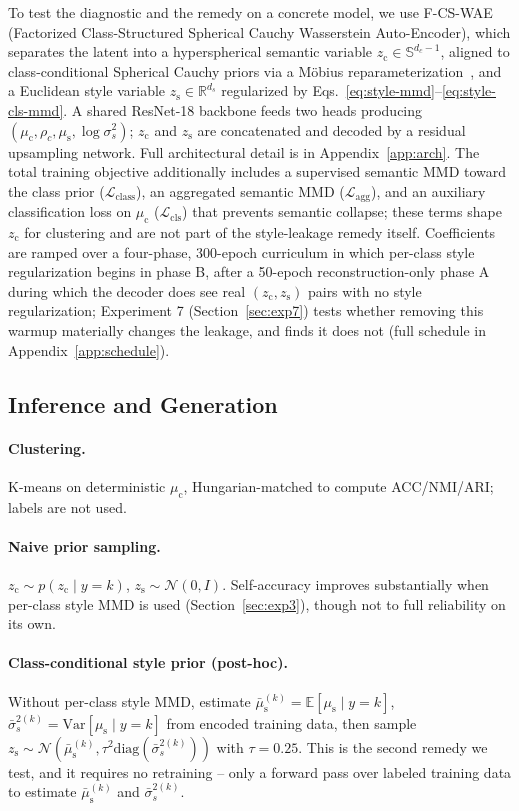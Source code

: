 \documentclass[10pt,letterpaper]{article}
\newcommand{\ours}{F-CS-WAE}
\newcommand{\zc}{z_{\mathrm{c}}}
\newcommand{\zs}{z_{\mathrm{s}}}
\newcommand{\muc}{\mu_{\mathrm{c}}}
\newcommand{\mus}{\mu_{\mathrm{s}}}
\newcommand{\Sph}{\mathbb{S}}
\newcommand{\R}{\mathbb{R}}
\newcommand{\diag}{\mathrm{diag}}
\begin{document}
To test the diagnostic and the remedy on a concrete model, we use \ours{}
(Factorized Class-Structured Spherical Cauchy Wasserstein Auto-Encoder),
which separates the latent into a hyperspherical semantic variable
$\zc\in\Sph^{d_c-1}$, aligned to class-conditional Spherical Cauchy priors
via a M\"obius reparameterization~\citep{sablica2025hyperspherical}, and a
Euclidean style variable $\zs\in\R^{d_s}$ regularized by
Eqs.~\ref{eq:style-mmd}--\ref{eq:style-cls-mmd}. A shared ResNet-18
backbone feeds two heads producing $(\muc,\rho_c,\mus,\log\sigma_s^2)$;
$\zc$ and $\zs$ are concatenated and decoded by a residual upsampling
network. Full architectural detail is in Appendix~\ref{app:arch}. The total
training objective additionally includes a supervised semantic MMD toward
the class prior ($\mathcal{L}_{\mathrm{class}}$), an aggregated semantic MMD
($\mathcal{L}_{\mathrm{agg}}$), and an auxiliary classification loss on
$\muc$ ($\mathcal{L}_{\mathrm{cls}}$) that prevents semantic collapse; these
terms shape $\zc$ for clustering and are not part of the style-leakage
remedy itself. Coefficients are ramped over a four-phase, 300-epoch
curriculum in which per-class style regularization begins in phase B, after
a 50-epoch reconstruction-only phase A during which the decoder does see
real $(\zc,\zs)$ pairs with no style regularization; Experiment 7
(Section~\ref{sec:exp7}) tests whether removing this warmup materially
changes the leakage, and finds it does not (full schedule in
Appendix~\ref{app:schedule}).

\subsection{Inference and Generation}

\paragraph{Clustering.} K-means on deterministic $\muc$, Hungarian-matched
to compute ACC/NMI/ARI; labels are not used.

\paragraph{Naive prior sampling.} $\zc\sim p(\zc\mid y{=}k)$,
$\zs\sim\mathcal{N}(0,I)$. Self-accuracy improves substantially when
per-class style MMD is used (Section~\ref{sec:exp3}), though not to full
reliability on its own.

\paragraph{Class-conditional style prior (post-hoc).} Without per-class
style MMD, estimate $\bar\mus^{(k)}=\mathbb{E}[\mus\mid y{=}k]$,
$\bar\sigma_s^{2(k)}=\mathrm{Var}[\mus\mid y{=}k]$ from encoded training
data, then sample $\zs\sim\mathcal{N}(\bar\mus^{(k)},\tau^2\diag(\bar\sigma_s^{2(k)}))$
with $\tau=0.25$. This is the second remedy we test, and it requires no
retraining -- only a forward pass over labeled training data to estimate
$\bar\mus^{(k)}$ and $\bar\sigma_s^{2(k)}$.
\end{document}
